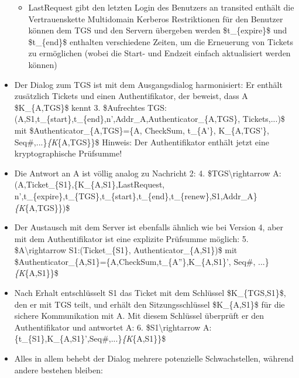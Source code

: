 \documentclass[a4paper]{article}
\begin{document}
\begin{multicols}{3}
\begin{itemize}
              \begin{itemize}
                  \item
                        LastRequest gibt den letzten Login des Benutzers an transited
                        enthält die Vertrauenskette Multidomain Kerberos Restriktionen für
                        den Benutzer können dem TGS und den Servern übergeben werden
                        \$t\_\{expire\}\$ und \$t\_\{end\}\$ enthalten verschiedene Zeiten,
                        um die Erneuerung von Tickets zu ermöglichen (wobei die Start- und
                        Endzeit einfach aktualisiert werden können)
              \end{itemize}
        \item
              Der Dialog zum TGS ist mit dem Ausgangsdialog harmonisiert: Er enthält
              zusätzlich Tickets und einen Authentifikator, der beweist, dass A
              \$K\_\{A,TGS\}\$ kennt 3. \$Aufrechtes
              TGS:(A,S1,t\_\{start\},t\_\{end\},n',Addr\_A,Authenticator\_\{A,TGS\},
              Tickets,...)\$ mit \$Authenticator\_\{A,TGS\}=\{A, CheckSum,
              t\_\{A'\}, K\_\{A,TGS'\}, Seq\#,...\}\emph{\{K}\{A,TGS\}\}\$ Hinweis:
              Der Authentifikator enthält jetzt eine kryptographische Prüfsumme!
        \item
              Die Antwort an A ist völlig analog zu Nachricht 2: 4.
              \$TGS\textbackslash rightarrow
              A:(A,Ticket\_\{S1\},\{K\_\{A,S1\},LastRequest,
              n',t\_\{expire\},t\_\{TGS\},t\_\{start\},t\_\{end\},t\_\{renew\},S1,Addr\_A\}\emph{\{K}\{A,TGS\}\})\$
        \item
              Der Austausch mit dem Server ist ebenfalls ähnlich wie bei Version 4,
              aber mit dem Authentifikator ist eine explizite Prüfsumme möglich: 5.
              \$A\textbackslash rightarrow S1:(Ticket\_\{S1\},
              Authenticator\_\{A,S1\})\$ mit
              \$Authenticator\_\{A,S1\}=\{A,CheckSum,t\_\{A''\},K\_\{A,S1\}', Seq\#,
              ...\}\emph{\{K}\{A,S1\}\}\$
        \item
              Nach Erhalt entschlüsselt S1 das Ticket mit dem Schlüssel
              \$K\_\{TGS,S1\}\$, den er mit TGS teilt, und erhält den
              Sitzungsschlüssel \$K\_\{A,S1\}\$ für die sichere Kommunikation mit A.
              Mit diesem Schlüssel überprüft er den Authentifikator und antwortet A:
              6. \$S1\textbackslash rightarrow
              A:\{t\_\{S1\},K\_\{A,S1\}',Seq\#,...\}\emph{\{K}\{A,S1\}\}\$
        \item
              Alles in allem behebt der Dialog mehrere potenzielle Schwachstellen,
              während andere bestehen bleiben:


\end{itemize}
\end{multicols}
\end{document}
